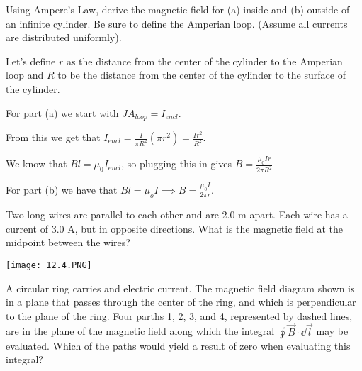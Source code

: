 \documentclass[../em.tex]{subfiles}
\begin{document}
\begin{example}
    Using Ampere's Law, derive the magnetic field for (a) inside and (b) outside of an infinite cylinder. Be sure to define the Amperian loop. (Assume all currents are distributed uniformly).

    Let's define $r$ as the distance from the center of the cylinder to the Amperian loop and $R$ to be the distance from the center of the cylinder to the surface of the cylinder.

    For part (a) we start with $JA_{loop}=I_{encl}$.

    From this we get that $I_{encl}=\frac{I}{\pi R^2}(\pi r^2)=\frac{Ir^2}{R^2}$.

    We know that $Bl=\mu_0I_{encl}$, so plugging this in gives $B=\frac{\mu_0Ir}{2\pi R^2}$

    For part (b) we have that $Bl=\mu_o I \implies B=\frac{\mu_0 I}{2\pi r}$.
\end{example}

\ex Two long wires are parallel to each other and are 2.0 m apart. Each wire has a current of 3.0 A, but in opposite directions. What is the magnetic field at the midpoint between the wires?

\ex \begin{center}
    \texttt{[image: 12.4.PNG]}
\end{center}
A circular ring carries and electric current. The magnetic field diagram shown is in a plane that passes through the center of the ring, and which is perpendicular to the plane of the ring.
Four parths 1, 2, 3, and 4, represented by dashed lines, are in the plane of the magnetic field along which the integral $\oint \vec{B}\cdot \dd \vec{l}$ may be evaluated. Which of the paths would yield a result of zero when evaluating this integral?
\end{document}
